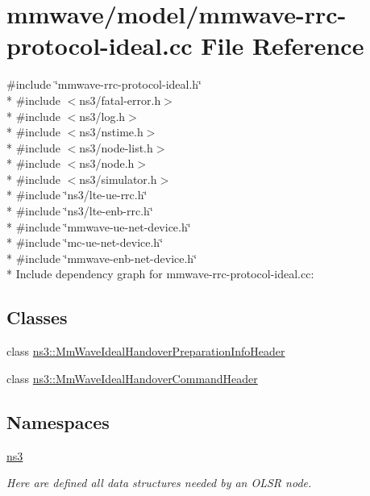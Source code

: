 \hypertarget{mmwave-rrc-protocol-ideal_8cc}{}\section{mmwave/model/mmwave-\/rrc-\/protocol-\/ideal.cc File Reference}
\label{mmwave-rrc-protocol-ideal_8cc}
{\ttfamily \#include \char`\"{}mmwave-\/rrc-\/protocol-\/ideal.\+h\char`\"{}}\\*
{\ttfamily \#include $<$ns3/fatal-\/error.\+h$>$}\\*
{\ttfamily \#include $<$ns3/log.\+h$>$}\\*
{\ttfamily \#include $<$ns3/nstime.\+h$>$}\\*
{\ttfamily \#include $<$ns3/node-\/list.\+h$>$}\\*
{\ttfamily \#include $<$ns3/node.\+h$>$}\\*
{\ttfamily \#include $<$ns3/simulator.\+h$>$}\\*
{\ttfamily \#include \char`\"{}ns3/lte-\/ue-\/rrc.\+h\char`\"{}}\\*
{\ttfamily \#include \char`\"{}ns3/lte-\/enb-\/rrc.\+h\char`\"{}}\\*
{\ttfamily \#include \char`\"{}mmwave-\/ue-\/net-\/device.\+h\char`\"{}}\\*
{\ttfamily \#include \char`\"{}mc-\/ue-\/net-\/device.\+h\char`\"{}}\\*
{\ttfamily \#include \char`\"{}mmwave-\/enb-\/net-\/device.\+h\char`\"{}}\\*
Include dependency graph for mmwave-\/rrc-\/protocol-\/ideal.cc\+:
\subsection*{Classes}
\begin{DoxyCompactItemize}
\item 
class \hyperlink{classns3_1_1MmWaveIdealHandoverPreparationInfoHeader}{ns3\+::\+Mm\+Wave\+Ideal\+Handover\+Preparation\+Info\+Header}
\item 
class \hyperlink{classns3_1_1MmWaveIdealHandoverCommandHeader}{ns3\+::\+Mm\+Wave\+Ideal\+Handover\+Command\+Header}
\end{DoxyCompactItemize}
\subsection*{Namespaces}
\begin{DoxyCompactItemize}
\item 
 \hyperlink{namespacens3}{ns3}
\begin{DoxyCompactList}\small\item\em Here are defined all data structures needed by an O\+L\+SR node. \end{DoxyCompactList}\end{DoxyCompactItemize}
